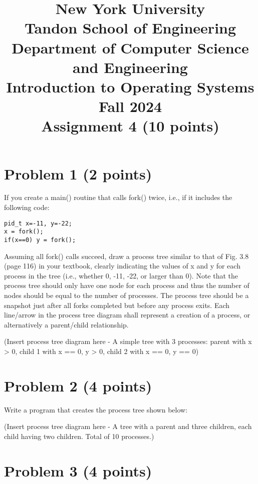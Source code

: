 \documentclass{article}
\begin{document}
\title{New York University \\ Tandon School of Engineering \\ Department of Computer Science and Engineering \\ Introduction to Operating Systems \\ Fall 2024 \\ Assignment 4 (10 points)}
\date{}
\maketitle

\section*{Problem 1 (2 points)}

If you create a main() routine that calls fork() twice, i.e., if it includes the following code:

\begin{verbatim}
pid_t x=-11, y=-22;
x = fork();
if(x==0) y = fork();
\end{verbatim}

Assuming all fork() calls succeed, draw a process tree similar to that of Fig. 3.8 (page 116) in your textbook, clearly indicating the values of x and y for each process in the tree (i.e., whether 0, -11, -22, or larger than 0). Note that the process tree should only have one node for each process and thus the number of nodes should be equal to the number of processes. The process tree should be a snapshot just after all forks completed but before any process exits. Each line/arrow in the process tree diagram shall represent a creation of a process, or alternatively a parent/child relationship.

(Insert process tree diagram here -  A simple tree with 3 processes: parent with x > 0, child 1 with x == 0, y > 0, child 2 with x == 0, y == 0)


\section*{Problem 2 (4 points)}

Write a program that creates the process tree shown below:

(Insert process tree diagram here - A tree with a parent and three children, each child having two children.  Total of 10 processes.)


\section*{Problem 3 (4 points)}
\end{document}
